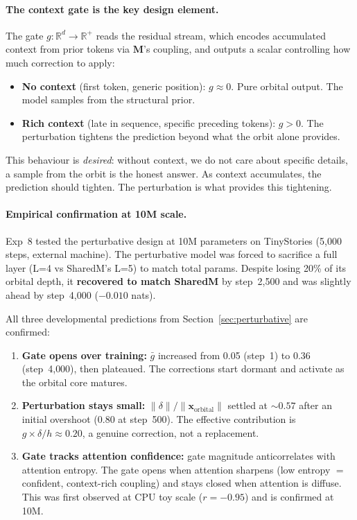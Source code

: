 \documentclass[11pt, a4paper]{article}
\newcommand{\M}{\mathbf{M}}
\newcommand{\x}{\mathbf{x}}
\newcommand{\R}{\mathbb{R}}
\theoremstyle{remark}
\begin{document}
\paragraph{The context gate is the key design element.}
The gate $g: \R^d \to \R^+$ reads the residual stream, which encodes accumulated context from prior tokens via $\M$'s coupling, and outputs a scalar controlling how much correction to apply:
\begin{itemize}[nosep]
    \item \textbf{No context} (first token, generic position): $g \approx 0$. Pure orbital output. The model samples from the structural prior.
    \item \textbf{Rich context} (late in sequence, specific preceding tokens): $g > 0$. The perturbation tightens the prediction beyond what the orbit alone provides.
\end{itemize}
This behaviour is \emph{desired}: without context, we do not care about specific details, a sample from the orbit is the honest answer.
As context accumulates, the prediction should tighten.
The perturbation is what provides this tightening.

\paragraph{Empirical confirmation at 10M scale.}
Exp~8 tested the perturbative design at 10M parameters on TinyStories (5{,}000 steps, external machine).
The perturbative model was forced to sacrifice a full layer (L=4 vs SharedM's L=5) to match total params.
Despite losing 20\% of its orbital depth, it \textbf{recovered to match SharedM} by step~2{,}500 and was slightly ahead by step~4{,}000 ($-0.010$ nats).

All three developmental predictions from Section~\ref{sec:perturbative} are confirmed:
\begin{enumerate}[nosep]
    \item \textbf{Gate opens over training:} $\bar{g}$ increased from 0.05 (step~1) to 0.36 (step~4{,}000), then plateaued. The corrections start dormant and activate as the orbital core matures.
    \item \textbf{Perturbation stays small:} $\|\delta\|/\|\x_{\text{orbital}}\|$ settled at ${\sim}0.57$ after an initial overshoot (0.80 at step~500). The effective contribution is $g \times \delta/h \approx 0.20$, a genuine correction, not a replacement.
    \item \textbf{Gate tracks attention confidence:} gate magnitude anticorrelates with attention entropy. The gate opens when attention sharpens (low entropy $=$ confident, context-rich coupling) and stays closed when attention is diffuse. This was first observed at CPU toy scale ($r = -0.95$) and is confirmed at 10M.
\end{enumerate}
\end{document}
